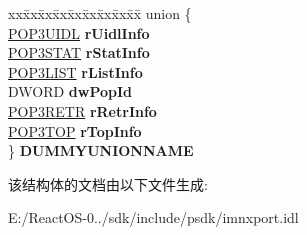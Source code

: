 \begin{DoxyCompactItemize}
\begin{tabbing}
xx\=xx\=xx\=xx\=xx\=xx\=xx\=xx\=xx\=\kill
union \{\\
\>\hyperlink{struct_i_p_o_p3_callback_1_1tag_p_o_p3_u_i_d_l}{POP3UIDL} {\bfseries rUidlInfo}\\
\>\hyperlink{struct_i_p_o_p3_callback_1_1tag_p_o_p3_s_t_a_t}{POP3STAT} {\bfseries rStatInfo}\\
\>\hyperlink{struct_i_p_o_p3_callback_1_1tag_p_o_p3_l_i_s_t}{POP3LIST} {\bfseries rListInfo}\\
\>DWORD {\bfseries dwPopId}\\
\>\hyperlink{struct_i_p_o_p3_callback_1_1tag_p_o_p3_r_e_t_r}{POP3RETR} {\bfseries rRetrInfo}\\
\>\hyperlink{struct_i_p_o_p3_callback_1_1tag_p_o_p3_t_o_p}{POP3TOP} {\bfseries rTopInfo}\\
\} {\bfseries DUMMYUNIONNAME}\\

\end{tabbing}\end{DoxyCompactItemize}


该结构体的文档由以下文件生成\+:\begin{DoxyCompactItemize}
\item 
E\+:/\+React\+O\+S-\/0../sdk/include/psdk/imnxport.\+idl\end{DoxyCompactItemize}
